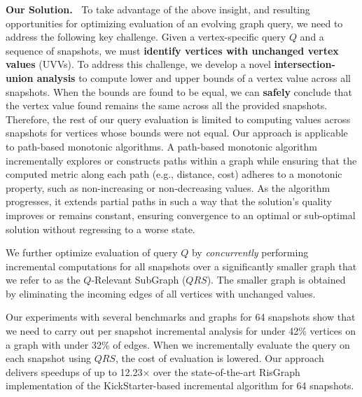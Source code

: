 \vspace{0.05in}
\noindent
\textbf{Our Solution.~}
To take advantage of the above insight, and resulting opportunities for optimizing evaluation of an evolving graph query, we need to address the following key challenge. Given a vertex-specific query $Q$ and a sequence of snapshots, we must \textbf{identify vertices with unchanged vertex values} (UVVs). To address this challenge, we develop a novel \textbf{intersection-union analysis} to compute lower and upper bounds of a vertex value across all snapshots. When the bounds are found to be equal, we can \textbf{safely} conclude that the vertex value found remains the same across all the provided snapshots. Therefore, the rest of our query evaluation is limited to computing values across snapshots for vertices whose bounds were not equal. Our approach is applicable to path-based monotonic algorithms. A path-based monotonic algorithm incrementally explores or constructs paths within a graph while ensuring that the computed metric along each path (e.g., distance, cost) adheres to a monotonic property, such as non-increasing or non-decreasing values. As the algorithm progresses, it extends partial paths in such a way that the solution's quality improves or remains constant, ensuring convergence to an optimal or sub-optimal solution without regressing to a worse state.

We further optimize evaluation of query $Q$ by \emph{concurrently} performing incremental computations for all snapshots over a significantly smaller graph that we refer to as the $Q$-Relevant SubGraph ($QRS$). The smaller graph is obtained by eliminating the incoming edges of all vertices with unchanged values.


Our experiments with several benchmarks and graphs for 64 snapshots show that we need to carry out per snapshot incremental analysis for under 42\% vertices on a graph with under 32\% of edges. When we incrementally evaluate the query on each snapshot using $QRS$, the cost of evaluation is lowered. 
Our approach delivers speedups of up to 12.23$\times$ over the state-of-the-art RisGraph implementation of the KickStarter-based incremental algorithm for 64 snapshots.


